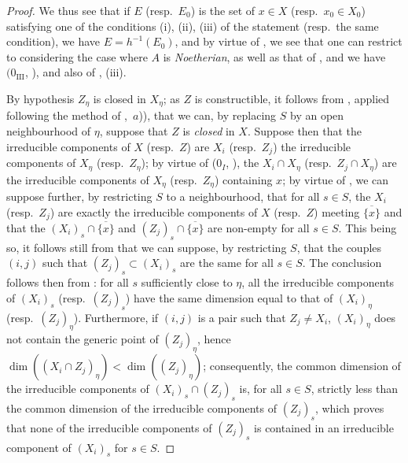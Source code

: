 \begin{proof}
We thus see that if $E$ (resp.~$E_0$) is the set of $x\in X$ (resp.~$x_0\in X_0$) satisfying one of the conditions (i), (ii), (iii) of the statement (resp.~the same condition), we have $E=h^{-1}(E_0)$, and by virtue of , we see that one can restrict to considering the case where $A$ is \emph{Noetherian}, as well as that of , and we have $(0_{\mathrm{III}}$, ), and also of , (iii).

By hypothesis $Z_\eta$ is closed in $X_\eta$; as $Z$ is constructible, it follows from , applied following the method of ,~$a$)), that we can, by replacing $S$ by an open neighbourhood of $\eta$, suppose that $Z$ is \emph{closed} in $X$.
Suppose then that the irreducible components of $X$ (resp.~$Z$) are $X_i$ (resp.~$Z_j$) the irreducible components of $X_\eta$ (resp.~$Z_\eta$); by virtue of ($0_I$, ), the $X_i\cap X_\eta$ (resp.~$Z_j\cap X_\eta$) are the irreducible components of $X_\eta$ (resp.~$Z_\eta$) containing $x$; by virtue of , we can suppose further, by restricting $S$ to a neighbourhood, that for all $s\in S$, the $X_i$ (resp.~$Z_j$) are exactly the irreducible components of $X$ (resp.~$Z$) meeting $\overline{\{x\}}$ and that the $(X_i)_s\cap\overline{\{x\}}$ and $(Z_j)_s\cap\overline{\{x\}}$ are non-empty for all $s\in S$.
This being so, it follows still from  that we can suppose, by restricting $S$, that the couples $(i,j)$ such that $(Z_j)_s\subset(X_i)_s$ are the same for all $s\in S$.
The conclusion follows then from : for all $s$ sufficiently close to $\eta$, all the irreducible components of $(X_i)_s$ (resp.~$(Z_j)_s$) have the same dimension equal to that of $(X_i)_\eta$ (resp.~$(Z_j)_\eta$).
Furthermore, if $(i,j)$ is a pair such that $Z_j\neq X_i$, $(X_i)_\eta$ does not contain the
generic point of $(Z_j)_\eta$, hence $\dim((X_i\cap Z_j)_\eta)<\dim((Z_j)_\eta)$; consequently, the common dimension of the irreducible components of $(X_i)_s\cap(Z_j)_s$ is, for all $s\in S$, strictly less than the common dimension of the irreducible components of $(Z_j)_s$, which proves that none of the irreducible components of $(Z_j)_s$ is contained in an irreducible component of $(X_i)_s$ for $s\in S$.
\end{proof}

